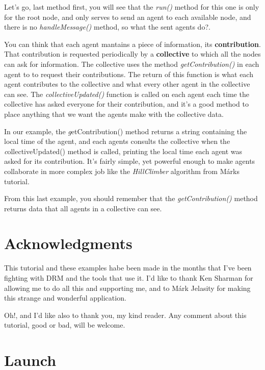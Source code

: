 \documentclass{article}
\begin{document}
Let's go, last method first, you will see that the \textsl{run()} method for this one is only for the root node, and only serves to send an agent to each available node, and there is no \textsl{handleMessage()} method, so what the sent agents do?.

You can think that each agent mantains a piece of information, its {\bf contribution}. That contribution is requested periodically by a {\bf collective} to which all the nodes can ask for information. The collective uses the method \textsl{getContribution()} in each agent to to request their contributions. The return of this function is what each agent contributes to the collective and what every other agent in the collective can see. The \textsl{collectiveUpdated()} function is called on each agent each time the collective has asked everyone for their contribution, and it's a good method to place anything that we want the agents make with the collective data.

In our example, the {\textsl getContribution()} method returns a string containing the local time of the agent, and each agents consults the collective when the {\textsl collectiveUpdated()} method is called, printing the local time each agent was asked for its contribution. It's fairly simple, yet powerful enough to make agents collaborate in more complex job like the \textsl{HillClimber} algorithm from M\'arks tutorial.

From this last example, you should remember that the \textsl{getContribution()} method returns data that all agents in a collective can see.

\section{Acknowledgments}
This tutorial and these examples habe been made in the months that I've been fighting with DRM and the tools that use it. I'd like to thank Ken Sharman for allowing me to do all this and supporting me, and to M\'ark Jelasity for making this strange and wonderful application.

Oh!, and I'd like also to thank you, my kind reader. Any comment about this tutorial, good or bad, will be welcome.
\pagebreak

\appendix

\section{Launch}
\label{launch5}
\pagebreak
\end{document}
